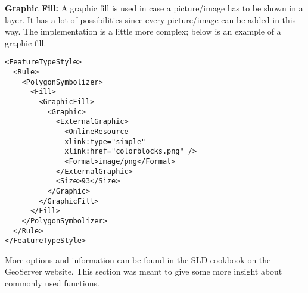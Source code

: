 \textbf{Graphic Fill:} A graphic fill is used in case a picture/image has
to be shown in a layer. It has a lot of possibilities since every
picture/image can be added in this way. The implementation is a little
more complex; below is an example of a graphic fill. 
\begin{lstlisting}
<FeatureTypeStyle>
  <Rule>
    <PolygonSymbolizer>
      <Fill>
        <GraphicFill>
          <Graphic>
            <ExternalGraphic>
              <OnlineResource
              xlink:type="simple"
              xlink:href="colorblocks.png" />
              <Format>image/png</Format>
            </ExternalGraphic>
            <Size>93</Size>
          </Graphic>
        </GraphicFill>
      </Fill>
    </PolygonSymbolizer>
  </Rule>
</FeatureTypeStyle>
\end{lstlisting}
More options and information can be found in the SLD cookbook on the
GeoServer website. This section was meant to give some more insight about 
commonly used functions.
  
